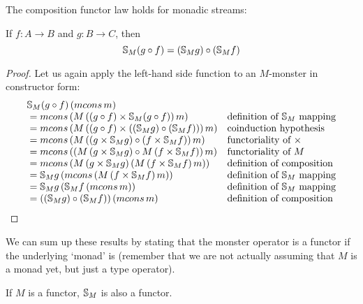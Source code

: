 \begin{lemma}\label{lemma:functor_comp}
The composition functor law holds for monadic streams:

If $f:A\rightarrow B$ and $g:B\rightarrow C$, then
$$
\mathbb{S}_{M} (g\circ f) = (\mathbb{S}_{M} g) \circ (\mathbb{S}_{M} f)
$$
\end{lemma}
\begin{proof}
Let us again apply the left-hand side function to an $M$-monster in constructor form:
$$
\begin{array}{ll}
\stream{M} (g\comp f)\,(\mcons\,m)\\
{}= \mcons\,(M\,((g\comp f)\times \stream{M} (g\comp f))\,m)
  & \mbox{definition of }\stream{M}\mbox{ mapping}\\
{}= \mcons\,(M\,((g\comp f)\times ((\stream{M} g) \comp (\stream{M} f)))\,m)
  & \mbox{coinduction hypothesis}\\ 
{}= \mcons\,(M\,((g\times \stream{M} g) \comp (f\times \stream{M} f))\,m)
  & \mbox{functoriality of }\times\\ 
{}= \mcons\,((M\,(g\times \stream{M} g) \comp M\,(f\times \stream{M} f))\,m)
  & \mbox{functoriality of }M\\ 
{}= \mcons\,(M\,(g\times \stream{M} g)\, (M\,(f\times \stream{M} f)\,m))
  & \mbox{definition of composition}\\ 
{}= \stream{M} g\, (\mcons\,(M\,(f\times \stream{M} f)\,m))
  & \mbox{definition of }\stream{M}\mbox{ mapping}\\ 
{}= \stream{M} g\, (\stream{M} f\,(\mcons\,m))
  & \mbox{definition of }\stream{M}\mbox{ mapping}\\ 
{}= ((\stream{M} g) \comp (\stream{M} f))\,(\mcons\,m)
  & \mbox{definition of composition}
\end{array}
$$
\end{proof}

We can sum up these results by stating that the monster operator is a functor if the underlying `monad' is (remember that we are not actually assuming that $M$ is a monad yet, but just a type operator).

\begin{theorem}
If $M$ is a functor, $\mathbb{S}_{M}$ is also a functor.
\end{theorem}
